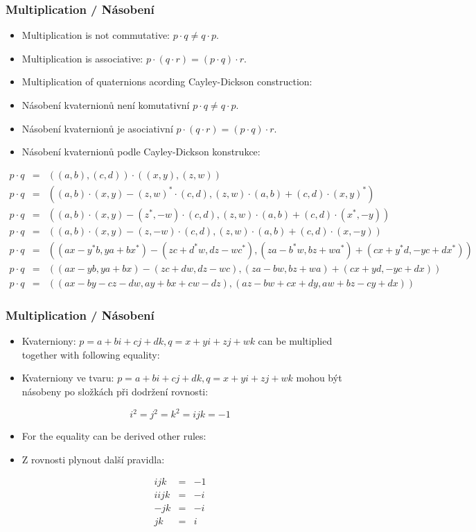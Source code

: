 \begin{frame}\frametitle{Multiplication / Násobení}\scriptsize
\begin{itemize}
\item Multiplication is not commutative: $p\cdot q \neq q \cdot p$.
\item Multiplication is associative: $p\cdot(q\cdot r)=(p\cdot q)\cdot r$.
\item Multiplication of quaternions acording Cayley-Dickson construction:
\end{itemize}
\begin{itemize}
\item Násobení kvaternionů není komutativní $p\cdot q \neq q \cdot p$.
\item Násobení kvaternionů je asociativní $p\cdot(q\cdot r)=(p\cdot q)\cdot r$.
\item Násobení kvaternionů podle Cayley-Dickson konstrukce:
\end{itemize}
{\tiny
\begin{eqnarray*}
p\cdot q &=& ((a,b),(c,d))\cdot((x,y),(z,w))\\
p\cdot q &=& ((a,b)\cdot(x,y)-(z,w)^*\cdot(c,d),(z,w)\cdot(a,b)+(c,d)\cdot(x,y)^*)\\
p\cdot q &=& ((a,b)\cdot(x,y)-(z^*,-w)\cdot(c,d),(z,w)\cdot(a,b)+(c,d)\cdot(x^*,-y))\\
p\cdot q &=& ((a,b)\cdot(x,y)-(z,-w)\cdot(c,d),(z,w)\cdot(a,b)+(c,d)\cdot(x,-y))\\
p\cdot q &=& ((ax-y^*b,ya+bx^*)-(zc+d^*w,dz-wc^*),(za-b^*w,bz+wa^*)+(cx+y^*d,-yc+dx^*))\\
p\cdot q &=& ((ax-yb,ya+bx)-(zc+dw,dz-wc),(za-bw,bz+wa)+(cx+yd,-yc+dx))\\
p\cdot q &=& ((ax-by-cz-dw,ay+bx+cw-dz),(az-bw+cx+dy,aw+bz-cy+dx))
\end{eqnarray*}
}
\end{frame}

\begin{frame}\frametitle{Multiplication / Násobení}\scriptsize

\begin{itemize}
\item Kvaterniony: $p=a+bi+cj+dk,q=x+yi+zj+wk$ can be multiplied together with following equality:
\item Kvaterniony ve tvaru: $p=a+bi+cj+dk,q=x+yi+zj+wk$ mohou být násobeny po složkách při dodržení rovnosti:
\end{itemize}

$$i^2=j^2=k^2=ijk=-1$$

\begin{itemize}
\item For the equality can be derived other rules:
\item Z rovnosti plynout další pravidla:
\end{itemize}

\begin{eqnarray*}
ijk &=& -1\\
iijk &=& -i\\
-jk &=& -i\\
jk &=& i
\end{eqnarray*}
\end{frame}

